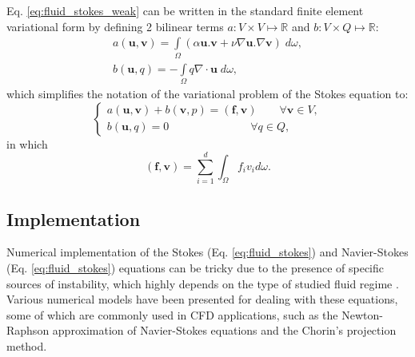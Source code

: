 Eq. \ref{eq:fluid_stokes_weak} can be written in the standard finite element variational form by defining 2 bilinear terms $a: V \times V \mapsto \mathbb{R}$ and $b: V \times Q \mapsto \mathbb{R}$:
\begin{equation}
\begin{array}{*{20}{l}}
\displaystyle  {a({\mathbf{u}},{\mathbf{v}}) = \int\limits_\Omega  {(\alpha {\mathbf{u}}.{\mathbf{v}} + \nu\nabla {\mathbf{u}}.\nabla {\mathbf{v}})\;d\omega ,} } \\
\displaystyle  {b({\mathbf{u}},{q}) =  - \int\limits_\Omega  {q\nabla\cdot{\mathbf{u}}\;d\omega ,} }
\end{array}
\end{equation}
which simplifies the notation of the variational problem of the Stokes equation to:
\begin{equation}
\left\{ {\begin{array}{*{20}{l}}
\displaystyle  {a({\mathbf{u}},{\mathbf{v}}) + {b}({\mathbf{v}},p) = ({\mathbf{f}},{\mathbf{v}})\qquad {\forall {\mathbf{v}}} \in V,} \\
\displaystyle  {b({\mathbf{u}},q) = 0\qquad \qquad \qquad \quad \;{\forall q} \in Q,}
\end{array}} \right.
\end{equation}
in which
\begin{equation}
(\mathbf{f}, \mathbf{v})=\sum_{i=1}^{d} \int_{\Omega} f_{i} v_{i} d \omega.
\end{equation}


\subsection{Implementation}

Numerical implementation of the Stokes (Eq. \ref{eq:fluid_stokes}) and Navier-Stokes (Eq. \ref{eq:fluid_stokes}) equations can be tricky due to the presence of specific sources of instability, which highly depends on the type of studied fluid regime \cite{Girault1979, Elman2014}. Various numerical models have been presented for dealing with these equations, some of which are commonly used in {CFD} applications, such as the Newton-Raphson approximation of Navier-Stokes equations and the Chorin's projection method.


